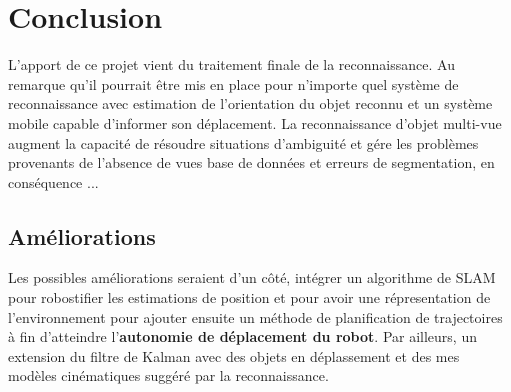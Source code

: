 {\color{green}
\chapter{Conclusion}

L'apport de ce projet vient du traitement finale de la reconnaissance. Au remarque qu'il pourrait être mis en place pour n'importe quel système de reconnaissance avec estimation de l'orientation du objet reconnu et un système mobile capable d'informer son déplacement. La reconnaissance d'objet multi-vue augment la capacité de résoudre situations d'ambiguité et gére les problèmes provenants de l'absence de vues base de données et erreurs de segmentation, en conséquence ...
}

\section{ Améliorations }
Les possibles améliorations seraient d'un côté, intégrer un algorithme de SLAM pour robostifier les estimations de position et pour avoir une répresentation de l'environnement pour ajouter ensuite un méthode de planification de trajectoires à fin d'atteindre l'\textbf{autonomie de déplacement du robot}. Par ailleurs, un extension du filtre de Kalman avec des objets en déplassement et des mes modèles cinématiques suggéré par la reconnaissance.




